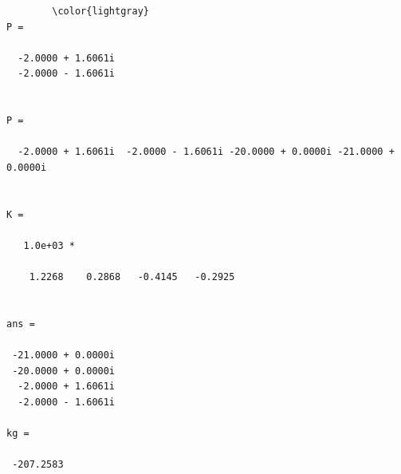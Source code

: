 \documentclass[12pt]{article}
\numberwithin{equation}{section}
\begin{document}
\begin{verbatim}
        \color{lightgray}
P =

  -2.0000 + 1.6061i
  -2.0000 - 1.6061i


P =

  -2.0000 + 1.6061i  -2.0000 - 1.6061i -20.0000 + 0.0000i -21.0000 + 0.0000i


K =

   1.0e+03 *

    1.2268    0.2868   -0.4145   -0.2925


ans =

 -21.0000 + 0.0000i
 -20.0000 + 0.0000i
  -2.0000 + 1.6061i
  -2.0000 - 1.6061i

kg =

 -207.2583

\end{verbatim} \color{black}
\end{document}
